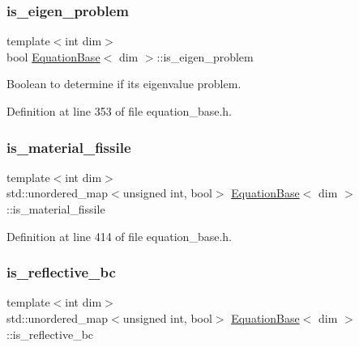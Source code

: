 \subsubsection{\texorpdfstring{is\+\_\+eigen\+\_\+problem}{is\_eigen\_problem}}
{\footnotesize\ttfamily template$<$int dim$>$ \\
bool \hyperlink{class_equation_base}{Equation\+Base}$<$ dim $>$\+::is\+\_\+eigen\+\_\+problem\hspace{0.3cm}{\ttfamily [protected]}}



Boolean to determine if it\textquotesingle{}s eigenvalue problem. 



Definition at line 353 of file equation\+\_\+base.\+h.

\mbox{\label{class_equation_base_a2568ffad6a52d3bf3227eea51a314cb4}} 
\subsubsection{\texorpdfstring{is\+\_\+material\+\_\+fissile}{is\_material\_fissile}}
{\footnotesize\ttfamily template$<$int dim$>$ \\
std\+::unordered\+\_\+map$<$unsigned int, bool$>$ \hyperlink{class_equation_base}{Equation\+Base}$<$ dim $>$\+::is\+\_\+material\+\_\+fissile\hspace{0.3cm}{\ttfamily [protected]}}



Definition at line 414 of file equation\+\_\+base.\+h.

\mbox{\label{class_equation_base_a91757532b2fd3759a976b22a83a9f8d8}} 
\subsubsection{\texorpdfstring{is\+\_\+reflective\+\_\+bc}{is\_reflective\_bc}}
{\footnotesize\ttfamily template$<$int dim$>$ \\
std\+::unordered\+\_\+map$<$unsigned int, bool$>$ \hyperlink{class_equation_base}{Equation\+Base}$<$ dim $>$\+::is\+\_\+reflective\+\_\+bc\hspace{0.3cm}{\ttfamily [protected]}}



